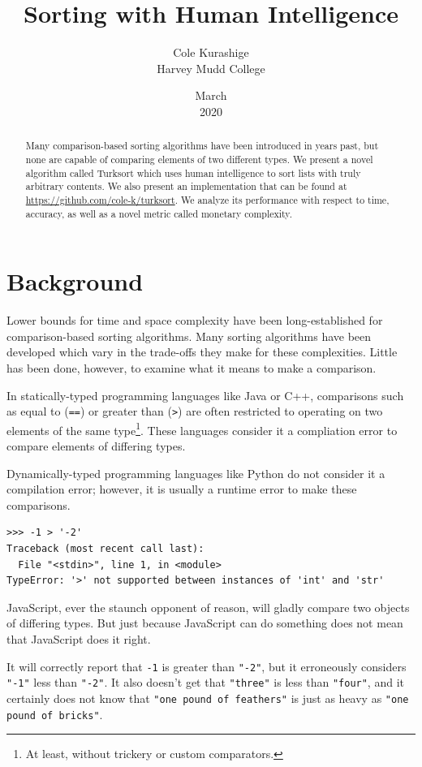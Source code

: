 \documentclass{article}
\title{Sorting with Human Intelligence}
\author{Cole Kurashige \\ Harvey Mudd College}
\date{March \\ 2020}
\begin{document}
\maketitle 

\begin{abstract}
  Many comparison-based sorting algorithms have been introduced in years past,
  but none are capable of comparing elements of two different types. We present
  a novel algorithm called Turksort which uses human intelligence to sort lists
  with truly arbitrary contents. We also present an implementation that can be
  found at \url{https://github.com/cole-k/turksort}. We analyze its performance
  with respect to time, accuracy, as well as a novel metric called monetary
  complexity.
\end{abstract}

\section{Background}
Lower bounds for time and space complexity have been long-established for
comparison-based sorting algorithms. Many sorting algorithms have been developed
which vary in the trade-offs they make for these complexities. Little has been
done, however, to examine what it means to make a comparison.

In statically-typed programming languages like Java or C++, comparisons such as
equal to (\texttt{==}) or greater than (\texttt{>}) are often restricted to
operating on two elements of the same type\footnote{At least, without trickery
  or custom comparators.}. These languages consider it a compliation error
to compare elements of differing types.

Dynamically-typed programming languages like Python do not consider it a
compilation error; however, it is usually a runtime error to make these
comparisons.

\begin{lstlisting}[caption = Comparisons in Python 3.7.6]
>>> -1 > '-2'
Traceback (most recent call last):
  File "<stdin>", line 1, in <module>
TypeError: '>' not supported between instances of 'int' and 'str'
\end{lstlisting}

JavaScript, ever the staunch opponent of reason, will gladly compare two objects
of differing types. But just because JavaScript can do something does not mean
that JavaScript does it right.

It will correctly report that \texttt{-1} is greater than \texttt{"-2"}, but it
erroneously considers \texttt{"-1"} less than \texttt{"-2"}. It also doesn't get
that \texttt{"three"} is less than \texttt{"four"}, and it certainly does not
know that \texttt{"one pound of feathers"} is just as heavy as \texttt{"one
  pound of bricks"}.
\end{document}

